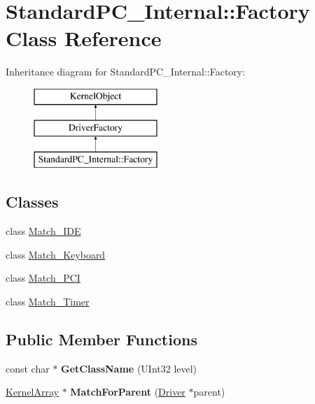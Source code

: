 \hypertarget{class_standard_p_c___internal_1_1_factory}{}\section{Standard\+P\+C\+\_\+\+Internal\+:\+:Factory Class Reference}
\label{class_standard_p_c___internal_1_1_factory}
Inheritance diagram for Standard\+P\+C\+\_\+\+Internal\+:\+:Factory\+:\begin{figure}[H]
\begin{center}
\leavevmode
\includegraphics[height=3.000000cm]{class_standard_p_c___internal_1_1_factory}
\end{center}
\end{figure}
\subsection*{Classes}
\begin{DoxyCompactItemize}
\item 
class \hyperlink{class_standard_p_c___internal_1_1_factory_1_1_match___i_d_e}{Match\+\_\+\+I\+DE}
\item 
class \hyperlink{class_standard_p_c___internal_1_1_factory_1_1_match___keyboard}{Match\+\_\+\+Keyboard}
\item 
class \hyperlink{class_standard_p_c___internal_1_1_factory_1_1_match___p_c_i}{Match\+\_\+\+P\+CI}
\item 
class \hyperlink{class_standard_p_c___internal_1_1_factory_1_1_match___timer}{Match\+\_\+\+Timer}
\end{DoxyCompactItemize}
\subsection*{Public Member Functions}
\begin{DoxyCompactItemize}
\item 
\mbox{\label{class_standard_p_c___internal_1_1_factory_a6f08529f24ebbfd458212eaad303b6d1}} 
const char $\ast$ {\bfseries Get\+Class\+Name} (U\+Int32 level)
\item 
\mbox{\label{class_standard_p_c___internal_1_1_factory_abf4d5bb16337cf994540d8923e87e2ce}} 
\hyperlink{class_kernel_array}{Kernel\+Array} $\ast$ {\bfseries Match\+For\+Parent} (\hyperlink{class_driver}{Driver} $\ast$parent)
\end{DoxyCompactItemize}

